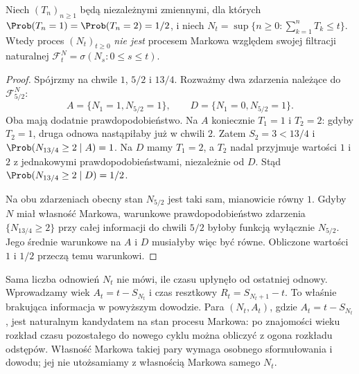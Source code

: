 \begin{twierdzenie}
Niech $(T_n)_{n\ge1}$ będą niezależnymi zmiennymi, dla których
$\Prob(T_n=1)=\Prob(T_n=2)=1/2$, i niech
$N_t=\sup\{n\ge0:\sum_{k=1}^nT_k\le t\}$.
Wtedy proces $(N_t)_{t\ge0}$ \emph{nie jest} procesem Markowa
względem swojej filtracji naturalnej
$\mathcal F_t^N=\sigma(N_s:0\le s\le t)$.
\end{twierdzenie}
\begin{proof}
Spójrzmy na chwile $1$, $5/2$ i $13/4$.
Rozważmy dwa zdarzenia należące do $\mathcal F_{5/2}^N$:
\[
A=\{N_1=1,N_{5/2}=1\},\qquad
D=\{N_1=0,N_{5/2}=1\}.
\]
Oba mają dodatnie prawdopodobieństwo.
Na $A$ koniecznie $T_1=1$ i $T_2=2$: gdyby
$T_2=1$, druga odnowa nastąpiłaby już w chwili $2$.
Zatem $S_2=3<13/4$ i
$\Prob(N_{13/4}\ge2\mid A)=1$.
Na $D$ mamy $T_1=2$, a $T_2$ nadal przyjmuje wartości
$1$ i $2$ z jednakowymi prawdopodobieństwami,
niezależnie od $D$. Stąd
$\Prob(N_{13/4}\ge2\mid D)=1/2$.

Na obu zdarzeniach obecny stan $N_{5/2}$ jest taki sam,
mianowicie równy $1$. Gdyby $N$ miał własność Markowa,
warunkowe prawdopodobieństwo zdarzenia
$\{N_{13/4}\ge2\}$ przy całej informacji do chwili $5/2$
byłoby funkcją wyłącznie $N_{5/2}$. Jego średnie
warunkowe na $A$ i $D$ musiałyby więc być równe.
Obliczone wartości $1$ i $1/2$ przeczą temu warunkowi.
\end{proof}

\begin{uwaga}
Sama liczba odnowień $N_t$ nie mówi, ile czasu upłynęło
od ostatniej odnowy. Wprowadzamy wiek
$A_t=t-S_{N_t}$ i czas resztkowy $R_t=S_{N_t+1}-t$. To właśnie brakująca informacja w
powyższym dowodzie. Para $(N_t,A_t)$, gdzie
$A_t=t-S_{N_t}$, jest naturalnym kandydatem na stan
procesu Markowa: po znajomości wieku rozkład czasu
pozostałego do nowego cyklu można obliczyć z ogona
rozkładu odstępów. Własność Markowa takiej pary
wymaga osobnego sformułowania i dowodu; jej nie
utożsamiamy z własnością Markowa samego $N_t$.
\end{uwaga}


